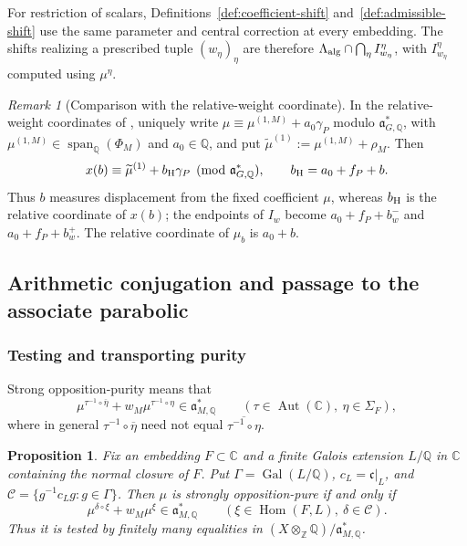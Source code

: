 \documentclass[12pt]{amsart}
\numberwithin{equation}{section}
\theoremstyle{plain}
\newtheorem{proposition}[theorem]{Proposition}
\theoremstyle{definition}
\theoremstyle{remark}
\newtheorem{remark}[theorem]{Remark}
\renewcommand{\bar}{\overline}
\begin{document}
For restriction of scalars, Definitions~\ref{def:coefficient-shift} and~\ref{def:admissible-shift} use the same parameter and central correction at every embedding. The shifts realizing a prescribed tuple $(w_\eta)_\eta$ are therefore $\Lambda_{\rm alg}\cap\bigcap_\eta I_{w_\eta}^{\eta}$, with $I_{w_\eta}^{\eta}$ computed using $\mu^\eta$.

\begin{remark}[Comparison with the relative-weight coordinate] \label{rem:harder-coordinate}
In the relative-weight coordinates of \cite[\S9.1.3]{HarderChapterNine}, uniquely write $\mu\equiv\mu^{(1,M)}+a_0\gamma_P$ modulo $\mathfrak a_{G,\mathbb Q}^*$, with $\mu^{(1,M)}\in\operatorname{span}_{\mathbb Q}(\Phi_M)$ and $a_0\in\mathbb Q$, and put $\widetilde\mu^{(1)}:=\mu^{(1,M)}+\rho_M$. Then 
\begin{equation}\label{eq:harder-coordinate}
 x(b)\equiv\widetilde\mu^{(1)}+b_{\rm H}\gamma_P
 \pmod{\mathfrak a_{G,\mathbb Q}^*},
 \qquad b_{\rm H}=a_0+f_P+b.
\end{equation}
Thus $b$ measures displacement from the fixed coefficient $\mu$, whereas $b_{\rm H}$ is the relative coordinate of $x(b)$; the endpoints of $I_w$ become $a_0+f_P+b_w^-$ and $a_0+f_P+b_w^+$. The relative coordinate of $\mu_b$ is $a_0+b$.
\end{remark}

\subsection{Arithmetic conjugation and passage to the associate parabolic}
\subsubsection{Testing and transporting purity}\label{sec:purity-transport}
Strong opposition-purity means that
\begin{equation}\label{eq:strong-purity}
 \mu^{\tau^{-1}\circ\bar\eta}+w_M\mu^{\tau^{-1}\circ\eta}
 \in\mathfrak a_{M,\mathbb Q}^*
 \qquad(\tau\in\operatorname{Aut}(\mathbb C),\ \eta\in\Sigma_F),
\end{equation}
where in general $\tau^{-1}\circ\bar\eta$ need not equal $\overline{\tau^{-1}\circ\eta}$.

\begin{proposition}\label{prop:finite-test}
Fix an embedding $F\subset\mathbb C$ and a finite Galois extension $L/\mathbb Q$ in $\mathbb C$ containing the normal closure of $F$. Put $\Gamma=\operatorname{Gal}(L/\mathbb Q)$, $c_L=\mathfrak c|_L$, and $\mathcal C=\{g^{-1}c_Lg:g\in\Gamma\}$. Then $\mu$ is strongly opposition-pure if and only if 
\begin{equation}\label{eq:finite-test}
 \mu^{\delta\circ\xi}+w_M\mu^\xi
 \in\mathfrak a_{M,\mathbb Q}^*
 \qquad(\xi\in\operatorname{Hom}(F,L),\ \delta\in\mathcal C).
\end{equation}
Thus it is tested by finitely many equalities in $(X\otimes_{\mathbb Z}\mathbb Q)/\mathfrak a_{M,\mathbb Q}^*$. 
\end{proposition}
\end{document}
